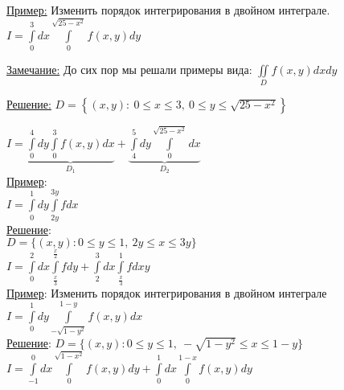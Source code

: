 
\underline{Пример:} Изменить порядок интегрирования в двойном интеграле.
$I = \int\limits_{0}^{3} dx \int\limits_{0}^{\sqrt{25-x^2}} f(x,y)dy$

\underline{Замечание:} До сих пор мы решали примеры вида: $\iint\limits_{D} f(x,y)dxdy$

\underline{Решение:} 
$D = \left\{ (x,y): \ 0 \leqslant x \leqslant 3, \ 0 \leqslant y \leqslant \sqrt{25 - x^2} \right\}$

$I = \underbrace{\int\limits_{0}^{4} dy \int\limits_{0}^{3} f(x,y) dx}_{D_1} + \underbrace{\int\limits_{4}^{5} dy \int\limits_{0}^{\sqrt{25 - x^2}} dx}_{D_2}$ \\

\underline{Пример}: \\
$I = \int\limits_{0}^{1} dy \int\limits_{2y}^{3y} fdx$ \\
\underline{Решение}: \\
$D = \{(x, y): 0 \leqslant y \leqslant 1, \ 2y \leqslant x \leqslant 3y\}$ \\
$\displaystyle I = \int\limits_{0}^{2} dx \int\limits_{\tfrac{x}{3}}^{\tfrac{x}{2}} fdy + \int\limits_{2}^{3} dx \int \limits_{\tfrac{x}{3}}^{1} fdxy$ \\


\underline{Пример}: Изменить порядок интегрирования в двойном интеграле \\
$\displaystyle  I = \int\limits_{0}^{1} dy \int\limits_{-\sqrt{1 - y^2}}^{1 - y} f(x, y) dx$ \\
\underline{Решение}: 
$D = \{(x, y): 0 \leqslant y \leqslant 1, \ -\sqrt{1 - y^2} \leqslant x \leqslant 1 - y\}$ \\
$\displaystyle  I = \int\limits_{-1}^{0} dx \int\limits_{0}^{\sqrt{1 - x^2}} f(x, y) dy + \int\limits_{0}^{1} dx \int\limits_{0}^{1 - x} f(x, y) dy$ \\




































